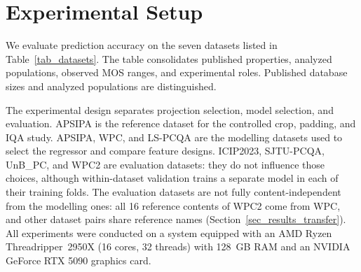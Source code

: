 \documentclass[final,3p,times,twocolumn]{elsarticle}
\begin{document}
\section{Experimental Setup}
\label{sec_setup}

We evaluate prediction accuracy on the seven datasets listed in Table~\ref{tab_datasets}. The table consolidates published properties, analyzed populations, observed \gls{MOS} ranges, and experimental roles. Published database sizes and analyzed populations are distinguished.

The experimental design separates projection selection, model selection, and evaluation. APSIPA is the reference dataset for the controlled crop, padding, and IQA study. APSIPA, WPC, and LS-PCQA are the modelling datasets used to select the regressor and compare feature designs. ICIP2023, SJTU-PCQA, UnB\_PC, and WPC2 are evaluation datasets: they do not influence those choices, although within-dataset validation trains a separate model in each of their training folds. The evaluation datasets are not fully content-independent from the modelling ones: all 16 reference contents of WPC2 come from WPC, and other dataset pairs share reference names (Section~\ref{sec_results_transfer}).
All experiments were conducted on a system equipped with an AMD Ryzen Threadripper\texttrademark~2950X (16 cores, 32 threads) with 128~GB RAM and an NVIDIA GeForce RTX 5090 graphics card.
\end{document}
